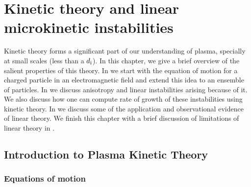 %
%
\chapter{Kinetic theory and linear microkinetic instabilities}\label{chap:chap2}

    Kinetic theory forms a significant part of our understanding of plasma, specially at small
    scales (less than a $d_{\rm i}$). In this chapter, we give a brief overview of the salient
    properties of this theory. In  we start with the equation of motion for a
    charged particle in an electromagnetic field and extend this idea to an ensemble of particles.
    In  we discuss anisotropy and linear instabilities arising because of it. We
    also discuss how one can compute rate of growth of these instabilities using kinetic theory. In
     we discuss some of the application and observational evidence of linear theory.
    We finish this chapter with a brief discussion of limitations of linear theory in
    .

    \section{Introduction to Plasma Kinetic Theory} \label{sec:intr2}

        \subsection{Equations of motion}\label{sec:eqom}

